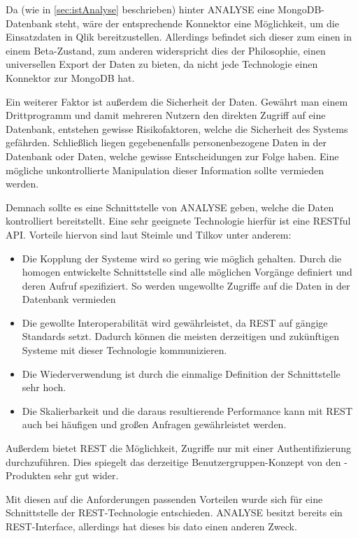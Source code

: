 Da (wie in \ref{sec:istAnalyse} beschrieben) hinter \gls{ANALYSE} eine MongoDB-Datenbank steht, wäre der entsprechende Konnektor eine Möglichkeit, um die Einsatzdaten in Qlik bereitzustellen.
Allerdings befindet sich dieser zum einen in einem Beta-Zustand, zum anderen widerspricht dies der Philosophie, einen universellen Export der Daten zu bieten, da nicht jede Technologie einen Konnektor zur MongoDB hat. 

Ein weiterer Faktor ist außerdem die Sicherheit der Daten.
Gewährt man einem Drittprogramm und damit mehreren Nutzern den direkten Zugriff auf eine Datenbank, entstehen gewisse Risikofaktoren, welche die Sicherheit des Systems gefährden.
Schließlich liegen gegebenenfalls personenbezogene Daten in der Datenbank oder Daten, welche gewisse Entscheidungen zur Folge haben.
Eine mögliche unkontrollierte Manipulation dieser Information sollte vermieden werden.

Demnach sollte es eine Schnittstelle von \gls{ANALYSE} geben, welche die Daten kontrolliert bereitstellt.
Eine sehr geeignete Technologie hierfür ist eine \gls{REST}ful API.
Vorteile hiervon sind laut Steimle \cite[2.3]{Steimle.2014} und Tilkov \cite[1.1]{Tilkov.2011} unter anderem:
\begin{itemize}
\item Die Kopplung der Systeme wird so gering wie möglich gehalten. 
Durch die homogen entwickelte Schnittstelle sind alle möglichen Vorgänge definiert und deren Aufruf spezifiziert.
So werden ungewollte Zugriffe auf die Daten in der Datenbank vermieden
\item Die gewollte Interoperabilität wird gewährleistet, da \gls{REST} auf gängige Standards setzt. 
Dadurch können die meisten derzeitigen und zukünftigen Systeme mit dieser Technologie kommunizieren.
\item Die Wiederverwendung ist durch die einmalige Definition der Schnittstelle sehr hoch.
\item Die Skalierbarkeit und die daraus resultierende Performance kann mit \gls{REST} auch bei häufigen und großen Anfragen gewährleistet werden.
\end{itemize}

Außerdem bietet \gls{REST} die Möglichkeit, Zugriffe nur mit einer Authentifizierung durchzuführen.
Dies spiegelt das derzeitige Benutzergruppen-Konzept von den \cweb-Produkten sehr gut wider.

Mit diesen auf die Anforderungen passenden Vorteilen wurde sich für eine Schnittstelle der \gls{REST}-Technologie entschieden.
\gls{ANALYSE} besitzt bereits ein \gls{REST}-Interface, allerdings hat dieses bis dato einen anderen Zweck.


